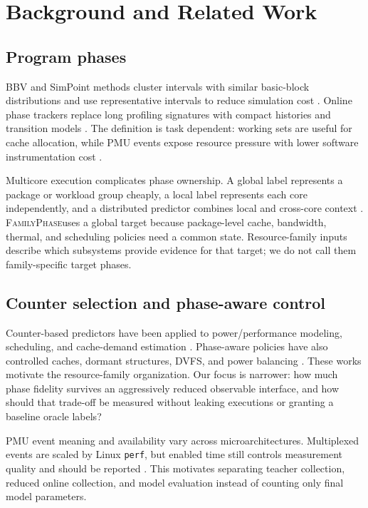 \documentclass[conference,10pt]{IEEEtran}
\newcommand{\system}{\textsc{FamilyPhase}}
\begin{document}
\section{Background and Related Work}

\subsection{Program phases}

BBV and SimPoint methods cluster intervals with similar basic-block distributions and
use representative intervals to reduce simulation cost
\cite{sherwood2001bbda,sherwood2002simpoint,hamerly2005simpoint3}. Online phase trackers
replace long profiling signatures with compact histories and transition models
\cite{sherwood2003phase}. The definition is task dependent: working sets are useful for
cache allocation, while PMU events expose resource pressure with lower software
instrumentation cost \cite{dhodapkar2002managing,dhodapkar2003comparing}.

Multicore execution complicates phase ownership. A global label represents a package
or workload group cheaply, a local label represents each core independently, and a
distributed predictor combines local and cross-core context
\cite{perelman2006parallel,chang2013sampling,lozano2022phase}. \system uses a global
target because package-level cache, bandwidth, thermal, and scheduling policies need a
common state. Resource-family inputs describe which subsystems provide evidence for
that target; we do not call them family-specific target phases.

\subsection{Counter selection and phase-aware control}

Counter-based predictors have been applied to power/performance modeling, scheduling,
and cache-demand estimation \cite{kim2017p4,nomani2015predicting,ziedan2016runtime}.
Phase-aware policies have also controlled caches, dormant structures, DVFS, and power
balancing \cite{balasubramonian2000memory,albonesi1999selective,
buyuktosunoglu2000drowsy,isci2003runtime,merkel2006balancing}. These works motivate the
resource-family organization. Our focus is narrower: how much phase fidelity survives
an aggressively reduced observable interface, and how should that trade-off be
measured without leaking executions or granting a baseline oracle labels?

PMU event meaning and availability vary across microarchitectures. Multiplexed events
are scaled by Linux \texttt{perf}, but enabled time still controls measurement quality
and should be reported \cite{intel2024optimization,intel2024sdm,linux2024perf,
perfwiki2024}. This motivates separating teacher collection, reduced online collection,
and model evaluation instead of counting only final model parameters.
\end{document}
